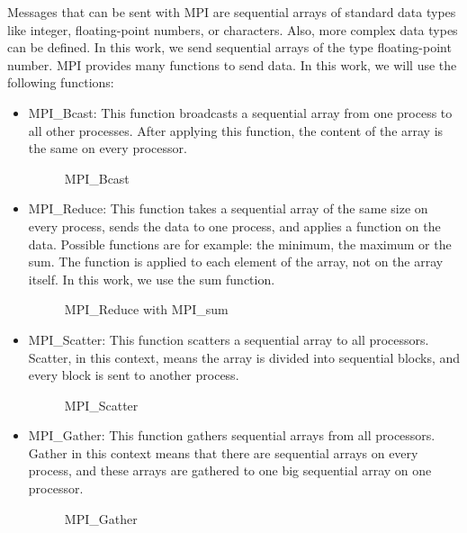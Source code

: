Messages that can be sent with MPI are sequential arrays of standard data types like integer, floating-point numbers, or characters.
Also, more complex data types can be defined. 
In this work, we send sequential arrays of the type floating-point number.
\newpage
MPI provides many functions to send data.
In this work, we will use the following functions:
\begin{itemize}
	\item MPI\_Bcast: This function broadcasts a sequential array from one process to all other processes. After applying this function, the content of the array is the same on every processor.
	\begin{figure}[H]
		\centering
		
		\caption{MPI\_Bcast}
		\label{fig:MPIBcast}
	\end{figure}
	\item MPI\_Reduce: This function takes a sequential array of the same size on every process, sends the data to one process, and applies a function on the data. Possible functions are for example: the minimum, the maximum or the sum. The function is applied to each element of the array, not on the array itself. In this work, we use the sum function.
	\begin{figure}[H]
		\centering
		
		\caption[MPI\_Reduce]{MPI\_Reduce with MPI\_sum}
		\label{fig:MPIReduce}
	\end{figure}
	\newpage
	\item MPI\_Scatter: This function scatters a sequential array to all processors. Scatter, in this context, means the array is divided into sequential blocks, and every block is sent to another process.
	\begin{figure}[H]
		\centering
		
		\caption{MPI\_Scatter}
		\label{fig:MPIScatter}
	\end{figure}
	\item MPI\_Gather: This function gathers sequential arrays from all processors. Gather in this context means that there are sequential arrays on every process, and these arrays are gathered to one big sequential array on one processor.
		\begin{figure}[H]
		\centering
		
		\caption{MPI\_Gather}
		\label{fig:MPIGather}
	\end{figure}
	
\end{itemize}
\newpage
